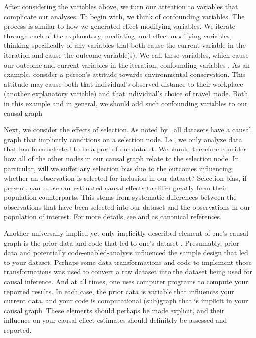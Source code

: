 After considering the variables above, we turn our attention to variables that complicate our analyses.
To begin with, we think of confounding variables.
The process is similar to how we generated effect modifying variables.
We iterate through each of the explanatory, mediating, and effect modifying variables, thinking specifically of any variables that both cause the current variable in the iteration and cause the outcome variable(s).
We call these variables, which cause our outcome and current variables in the iteration, confounding variables \citep{elwert_2013_graphical, greenland_1999_confounding}.
As an example, consider a person's attitude towards environmental conservation.
This attitude may cause both that individual's observed distance to their workplace (another explanatory variable) and that individual's choice of travel mode.
Both in this example and in general, we should add such confounding variables to our causal graph.

Next, we consider the effects of selection.
As noted by \citet{greenland_2020_causal}, all datasets have a causal graph that implicitly conditions on a selection node.
I.e., we only analyze data that has been selected to be a part of our dataset.
We should therefore consider how all of the other nodes in our causal graph relate to the selection node.
In particular, will we suffer any selection bias due to the outcomes influencing whether an observation is selected for inclusion in our dataset?
Selection bias, if present, can cause our estimated causal effects to differ greatly from their population counterparts.
This stems from systematic differences between the observations that have been selected into our dataset and the observations in our population of interest.
For more details, see \citet{heckman_1979_sample} and \citet{hernan_2004_structural} as canonical references.

Another universally implied yet only implicitly described element of one's causal graph is the prior data and code that led to one's dataset \citep[Pg.7]{greenland_2020_causal}.
Presumably, prior data and potentially code-enabled-analysis influenced the sample design that led to your dataset.
Perhaps some data transformations and code to implement those transformations was used to convert a raw dataset into the dataset being used for causal inference.
And at all times, one uses computer programs to compute your reported results.
In each case, the prior data is variable that influences your current data, and your code is computational (sub)graph that is implicit in your causal graph.
These elements should perhaps be made explicit, and their influence on your causal effect estimates should definitely be assessed and reported.

